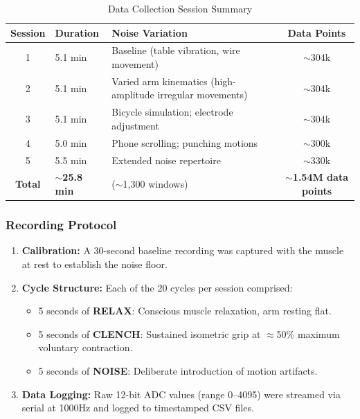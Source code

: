 \documentclass{article}
\begin{document}
\begin{table}[h]
    \centering
    \caption{Data Collection Session Summary}
    \label{tab:sessions}
    \begin{tabular}{c l l c}
        \hline
        \textbf{Session} & \textbf{Duration} & \textbf{Noise Variation} & \textbf{Data Points} \\
        \hline
        1 & 5.1 min & Baseline (table vibration, wire movement) & $\sim$304k \\
        2 & 5.1 min & Varied arm kinematics (high-amplitude irregular movements) & $\sim$304k \\
        3 & 5.1 min & Bicycle simulation; electrode adjustment & $\sim$304k \\
        4 & 5.0 min & Phone scrolling; punching motions & $\sim$300k \\
        5 & 5.5 min & Extended noise repertoire & $\sim$330k \\
        \hline
        \textbf{Total} & \textbf{$\sim$25.8 min} & ($\sim$1,300 windows) & \textbf{$\sim$1.54M data points} \\
        \hline
    \end{tabular}
\end{table}

\subsubsection{Recording Protocol}
\begin{enumerate}
    \item \textbf{Calibration:} A 30-second baseline recording was captured with the muscle at rest to establish the noise floor.
    \item \textbf{Cycle Structure:} Each of the 20 cycles per session comprised:
    \begin{itemize}
        \item 5 seconds of \textbf{RELAX}: Conscious muscle relaxation, arm resting flat.
        \item 5 seconds of \textbf{CLENCH}: Sustained isometric grip at $\approx$50\% maximum voluntary contraction.
        \item 5 seconds of \textbf{NOISE}: Deliberate introduction of motion artifacts.
    \end{itemize}
    \item \textbf{Data Logging:} Raw 12-bit ADC values (range 0--4095) were streamed via serial at 1000Hz and logged to timestamped CSV files.
\end{enumerate}
\end{document}
